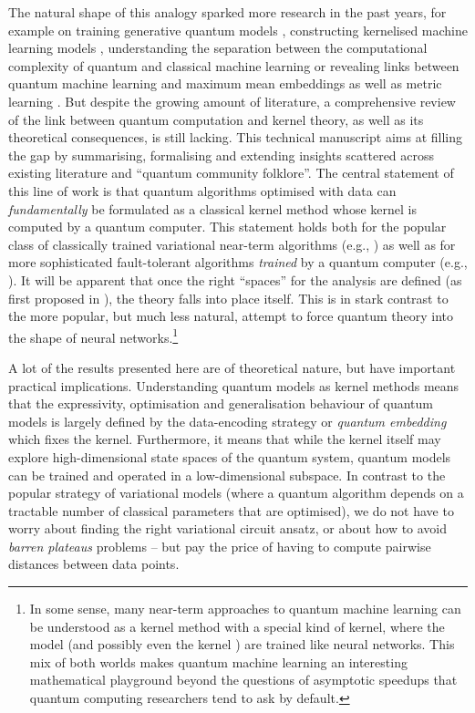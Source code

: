 \documentclass[aps, reprint, onecolumn, nofootinbib, longbibliography]{revtex4-2}
\begin{document}
The natural shape of this analogy sparked more research in the past years, for example on training generative quantum models \citep{liu2018differentiable}, constructing kernelised machine learning models \citep{blank2020quantum}, understanding the separation between the computational complexity of quantum and classical machine learning \citep{havlivcek2019supervised, liu2020rigorous, huang2020power} or revealing links between quantum machine learning and maximum mean embeddings \citep{kubler2019quantum} as well as metric learning \citep{lloyd2020quantum}. But despite the growing amount of literature, a comprehensive review of the link between quantum computation and kernel theory, as well as its theoretical consequences, is still lacking. This technical manuscript aims at filling the gap by summarising, formalising and extending insights scattered across existing literature and ``quantum community folklore''. The central statement of this line of work is that quantum algorithms optimised with data can \textit{fundamentally} be formulated as a classical kernel method whose kernel is computed by a quantum computer. This statement holds both for the popular class of classically trained variational near-term algorithms (e.g., \cite{benedetti2019parameterized}) as well as for more sophisticated fault-tolerant algorithms \textit{trained} by a quantum computer (e.g., \cite{rebentrost2014quantum}). It will be apparent that once the right ``spaces'' for the analysis are defined (as first proposed in \cite{havlivcek2019supervised}), the theory falls into place itself. This is in stark contrast to the more popular, but much less natural, attempt to force quantum theory into the shape of neural networks.\footnote{In some sense, many near-term approaches to quantum machine learning can be understood as a kernel method with a special kind of kernel, where the model (and possibly even the kernel \citep{lloyd2020quantum}) are trained like neural networks. This mix of both worlds makes quantum machine learning an interesting mathematical playground beyond the questions of asymptotic speedups that quantum computing researchers tend to ask by default. } 

A lot of the results presented here are of theoretical nature, but have important practical implications. Understanding quantum models as kernel methods means that the expressivity, optimisation and generalisation behaviour of quantum models is largely defined by the data-encoding strategy or \textit{quantum embedding} which fixes the kernel. Furthermore, it means that while the kernel itself may explore high-dimensional state spaces of the quantum system, quantum models can be trained and operated in a low-dimensional subspace. In contrast to the popular strategy of variational models (where a quantum algorithm depends on a tractable number of classical parameters that are optimised), we do not have to worry about finding the right variational circuit ansatz, or about how to avoid \textit{barren plateaus} problems \cite{mcclean2018barren, holmes2021connecting} -- but pay the price of having to compute pairwise distances between data points. 
\end{document}
